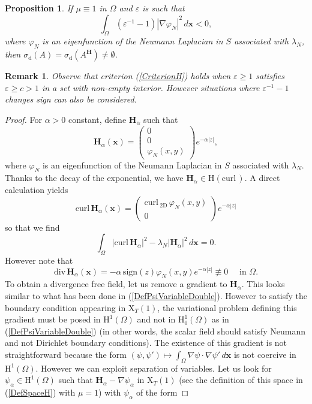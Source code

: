 \documentclass[11pt,a4paper]{article}
\newcommand{\dsp}{\displaystyle}
\newcommand{\eps}{\varepsilon}
\newcommand{\Om}{\Omega}
\newcommand{\mrm}[1]{\mathrm{#1}}
\newcommand{\bfx}{\boldsymbol{x}}
\newcommand{\mH}{\mrm{H}}
\newcommand{\mX}{\mrm{X}}
\newcommand{\curlvec}{\boldsymbol{\mrm{curl}}\,}
\renewcommand{\div}{\mrm{div}}
\def\H{\boldsymbol{H}}
\newtheorem{remark}[theorem]{Remark}
\newtheorem{proposition}[theorem]{Proposition}
\begin{document}
\begin{proposition}\label{PropositionepsVaria}
If $\mu\equiv1$ in $\Om$  and $\eps$ is such that
\begin{equation}\label{CriterionH}
\dsp\int_\Om (\eps^{-1}-1)|\nabla\varphi_N|^2\,d\bfx<0,
\end{equation}
where $\varphi_N$ is an eigenfunction of the Neumann Laplacian in $S$ associated with $\lambda_N$, then $\sigma_{\mrm{d}}(A)=\sigma_{\mrm{d}}(A^{\H})\ne\emptyset$.  
\end{proposition}
\begin{remark}
Observe that criterion (\ref{CriterionH}) holds when $\eps\ge1$ satisfies $\eps\ge c>1$ in a set with non-empty interior. However situations where $\eps^{-1}-1$ changes sign can also be considered.
\end{remark}
\begin{proof}
For $\alpha>0$ constant, define $\H_\alpha$ such that
\[
\H_\alpha(\bfx)=\left(\begin{array}{c}
0\\
0\\
\varphi_N(x,y)
\end{array}\right)e^{-\alpha|z|},
\]
where $\varphi_N$ is an eigenfunction of the Neumann Laplacian in $S$ associated with $\lambda_N$. Thanks to the decay of the exponential, we have $\H_\alpha\in\boldsymbol{\mH}(\curlvec)$. A direct calculation yields
\[
\curlvec\H_\alpha(\bfx)=\left(\begin{array}{c}
\curlvec_{\mrm{2D}}\,\varphi_N(x,y)\\[2pt]
0
\end{array}\right)e^{-\alpha|z|}
\]
so that we find
\[
\dsp\int_{\Om}|\curlvec\H_\alpha|^2-\lambda_N|\H_\alpha|^2\,d\bfx =0.
\]
However note that
\[
\div\,\H_\alpha(\bfx)=-\alpha\,\mrm{sign}(z)\varphi_N(x,y)e^{-\alpha|z|}\not\equiv0\quad\mbox{ in }\Om.
\]
To obtain a divergence free field, let us remove a gradient to $\H_\alpha$. This looks similar to what has been done in (\ref{DefPsiVariableDouble}). However to satisfy the boundary condition appearing in $\boldsymbol{\mX}_T(1)$, the variational problem defining this gradient must be posed in $\mH^1(\Om)$ and not in $\mH^1_0(\Om)$ as in (\ref{DefPsiVariableDouble}) (in other words, the scalar field should satisfy Neumann and not Dirichlet boundary conditions). The existence of this gradient is not straightforward because the form $(\psi,\psi')\mapsto \int_\Om\nabla\psi\cdot\nabla\psi'\,d\bfx$ is not coercive in $\mH^1(\Om)$. However we can exploit separation of variables. Let us look for $\psi_\alpha\in\mH^1(\Om)$ such that $\H_\alpha-\nabla\psi_\alpha$ in $\boldsymbol{\mX}_T(1)$ (see the definition of this space in (\ref{DefSpaceH}) with $\mu=1$) with $\psi_\alpha$ of the form

\end{proof}
\end{document}
